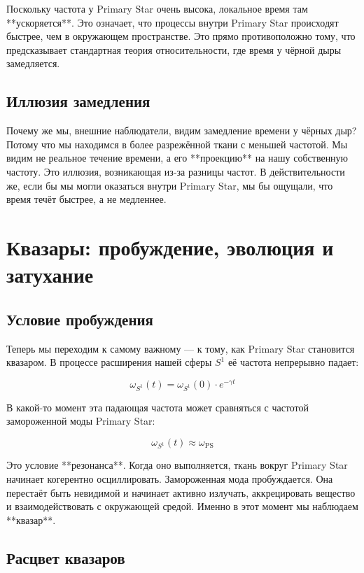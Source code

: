 \documentclass[12pt,a4paper]{article}
\begin{document}
Поскольку частота у Primary Star очень высока, локальное время там **ускоряется**. Это означает, что процессы внутри Primary Star происходят быстрее, чем в окружающем пространстве. Это прямо противоположно тому, что предсказывает стандартная теория относительности, где время у чёрной дыры замедляется.

\subsection{Иллюзия замедления}

Почему же мы, внешние наблюдатели, видим замедление времени у чёрных дыр? Потому что мы находимся в более разрежённой ткани с меньшей частотой. Мы видим не реальное течение времени, а его **проекцию** на нашу собственную частоту. Это иллюзия, возникающая из-за разницы частот. В действительности же, если бы мы могли оказаться внутри Primary Star, мы бы ощущали, что время течёт быстрее, а не медленнее.

\section{Квазары: пробуждение, эволюция и затухание}

\subsection{Условие пробуждения}

Теперь мы переходим к самому важному — к тому, как Primary Star становится квазаром. В процессе расширения нашей сферы \(S^1\) её частота непрерывно падает:

\[
\omega_{S^1}(t) = \omega_{S^1}(0) \cdot e^{-\gamma t}
\]

В какой-то момент эта падающая частота может сравняться с частотой замороженной моды Primary Star:

\[
\omega_{S^1}(t) \approx \omega_{\text{PS}}
\]

Это условие **резонанса**. Когда оно выполняется, ткань вокруг Primary Star начинает когерентно осциллировать. Замороженная мода пробуждается. Она перестаёт быть невидимой и начинает активно излучать, аккрецировать вещество и взаимодействовать с окружающей средой. Именно в этот момент мы наблюдаем **квазар**.

\subsection{Расцвет квазаров}
\end{document}

